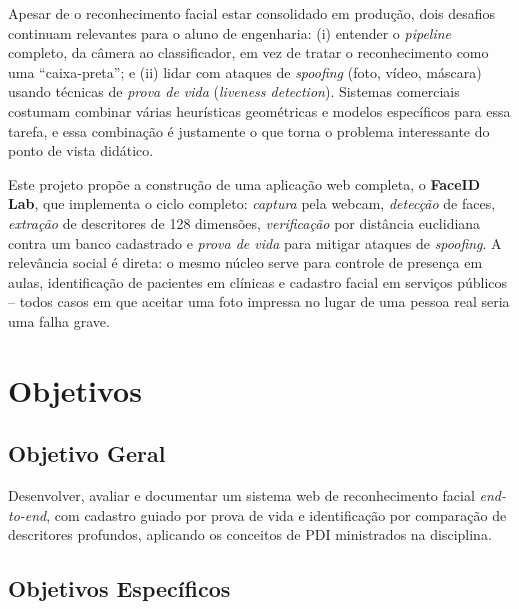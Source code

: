 \documentclass[12pt,a4paper]{article}
\begin{document}
Apesar de o reconhecimento facial estar consolidado em produ\c{c}\~ao, dois desafios continuam
relevantes para o aluno de engenharia: (i) entender o \emph{pipeline} completo,
da c\^amera ao classificador, em vez de tratar o reconhecimento como uma ``caixa-preta''; e
(ii) lidar com ataques de \emph{spoofing} (foto, v\'ideo, m\'ascara) usando t\'ecnicas de
\emph{prova de vida} (\emph{liveness detection}). Sistemas comerciais costumam combinar
v\'arias heur\'isticas geom\'etricas e modelos espec\'ificos para essa tarefa, e essa combina\c{c}\~ao
\'e justamente o que torna o problema interessante do ponto de vista did\'atico.

Este projeto prop\~oe a constru\c{c}\~ao de uma aplica\c{c}\~ao web completa, o \textbf{FaceID Lab},
que implementa o ciclo completo: \emph{captura} pela webcam, \emph{detec\c{c}\~ao} de faces,
\emph{extra\c{c}\~ao} de descritores de 128 dimens\~oes, \emph{verifica\c{c}\~ao}
por dist\^ancia euclidiana contra um banco cadastrado e \emph{prova de vida} para mitigar
ataques de \emph{spoofing}. A relev\^ancia social \'e direta: o mesmo n\'ucleo serve para
controle de presen\c{c}a em aulas, identifica\c{c}\~ao de pacientes em cl\'inicas e cadastro
facial em servi\c{c}os p\'ublicos -- todos casos em que aceitar uma foto impressa no lugar
de uma pessoa real seria uma falha grave.

\section{Objetivos}

\subsection*{Objetivo Geral}

Desenvolver, avaliar e documentar um sistema web de reconhecimento facial \emph{end-to-end},
com cadastro guiado por prova de vida e identifica\c{c}\~ao por compara\c{c}\~ao de descritores
profundos, aplicando os conceitos de PDI ministrados na disciplina.

\subsection*{Objetivos Espec\'ificos}
\end{document}
